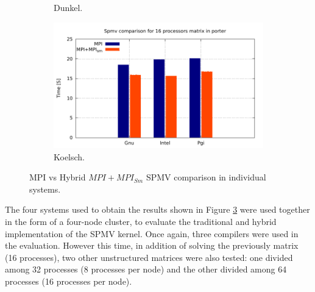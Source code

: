 \begin{figure} [h!]
\begin{subfigure}{.6\textwidth}
      \caption[]{Dunkel.}
      \label{fig:HybridDunkel}
    \end{subfigure}%
    \begin{subfigure}{.6\textwidth}
      \centering
      \hspace*{-1.5cm} 
      \includegraphics[page=4, width=0.95\linewidth]{Plots/HybridProgramming/spmvIndividual.pdf}
      \caption{Koelsch.}
      \label{fig:HybridKoelsh}
    \end{subfigure}
\caption{MPI vs Hybrid $MPI+MPI_{Sm}$ SPMV comparison in individual systems.}
\label{fig:spmvIndividual}
\end{figure}


\medskip

The four systems used to obtain the results shown in Figure \ref{fig:spmvIndividual} were used together in the form of a four-node cluster, to evaluate the traditional and hybrid implementation of the SPMV kernel. Once again, three compilers were used in the evaluation. However this time, in addition of solving the previously matrix (16 processes), two other unstructured matrices were also tested: one divided among 32 processes (8 processes per node) and the other divided among 64 processes (16 processes per node). 


